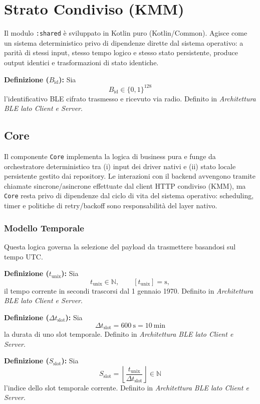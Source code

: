 \documentclass[a4paper,11pt,table,dvipsnames]{article}
\begin{document}
\section{Strato Condiviso (KMM)}
Il modulo \texttt{:shared} è sviluppato in Kotlin puro (Kotlin/Common). Agisce come un sistema deterministico privo di dipendenze dirette dal sistema operativo: a parità di stessi input, stesso tempo logico e stesso stato persistente, produce output identici e trasformazioni di stato identiche.

\textbf{Definizione (\(B_{\text{id}}\)):}
Sia
\[
    B_{\text{id}} \in \{0,1\}^{128}
\]
l’identificativo BLE cifrato trasmesso e ricevuto via radio.
Definito in \emph{Architettura BLE lato Client e Server}.

\subsection{Core}
Il componente \texttt{Core} implementa la logica di business pura e funge da orchestratore deterministico tra (i) input dei driver nativi e (ii) stato locale persistente gestito dai repository.
Le interazioni con il backend avvengono tramite chiamate sincrone/asincrone effettuate dal client HTTP condiviso (KMM), ma \texttt{Core} resta privo di dipendenze dal ciclo di vita del sistema operativo: scheduling, timer e politiche di retry/backoff sono responsabilità del layer nativo.

\subsubsection{Modello Temporale}
Questa logica governa la selezione del payload da trasmettere basandosi sul tempo UTC.

\textbf{Definizione (\(t_{\text{unix}}\)):}
Sia
\[
    t_{\text{unix}} \in \mathbb{N}, \qquad [t_{\text{unix}}] = \si{\second},
\]
il tempo corrente in secondi trascorsi dal 1 gennaio 1970.
Definito in \emph{Architettura BLE lato Client e Server}.

\textbf{Definizione (\(\Delta t_{\text{slot}}\)):}
Sia
\[
    \Delta t_{\text{slot}} = \SI{600}{\second} = \SI{10}{\minute}
\]
la durata di uno slot temporale.
Definito in \emph{Architettura BLE lato Client e Server}.

\textbf{Definizione (\(S_{\text{slot}}\)):}
Sia
\[
    S_{\text{slot}}
    = \left\lfloor \frac{t_{\text{unix}}}{\Delta t_{\text{slot}}} \right\rfloor
    \in \mathbb{N}
\]
l'indice dello slot temporale corrente.
Definito in \emph{Architettura BLE lato Client e Server}.
\end{document}
